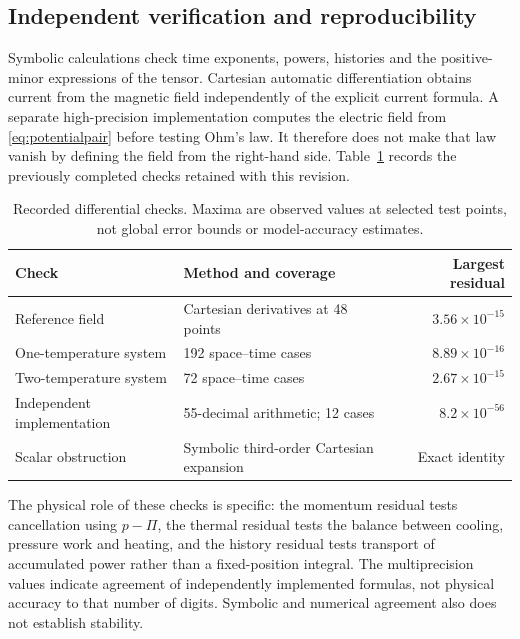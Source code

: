 \documentclass[11pt,a4paper]{article}
\theoremstyle{remark}\newtheorem{remark}{Remark}
\numberwithin{equation}{section}
\begin{document}
\subsection{Independent verification and reproducibility}
Symbolic calculations check time exponents, powers, histories and the positive-minor expressions of the tensor. Cartesian automatic differentiation obtains current from the magnetic field independently of the explicit current formula. A separate high-precision implementation computes the electric field from \eqref{eq:potentialpair} before testing Ohm's law. It therefore does not make that law vanish by defining the field from the right-hand side. Table~\ref{tab:residuals} records the previously completed checks retained with this revision.
\begin{table}[htbp]
\centering\small
\caption{Recorded differential checks. Maxima are observed values at selected test points, not global error bounds or model-accuracy estimates.}
\label{tab:residuals}
\begin{tabularx}{\linewidth}{@{}p{.23\linewidth}Xr@{}}\toprule
Check & Method and coverage & Largest residual\\\midrule
Reference field & Cartesian derivatives at 48 points & $3.56\times10^{-15}$\\
One-temperature system & 192 space--time cases & $8.89\times10^{-16}$\\
Two-temperature system & 72 space--time cases & $2.67\times10^{-15}$\\
Independent implementation & 55-decimal arithmetic; 12 cases & $8.2\times10^{-56}$\\
Scalar obstruction & Symbolic third-order Cartesian expansion & Exact identity\\\bottomrule
\end{tabularx}
\end{table}
The physical role of these checks is specific: the momentum residual tests cancellation using $p-\Pi$, the thermal residual tests the balance between cooling, pressure work and heating, and the history residual tests transport of accumulated power rather than a fixed-position integral. The multiprecision values indicate agreement of independently implemented formulas, not physical accuracy to that number of digits. Symbolic and numerical agreement also does not establish stability.
\end{document}
